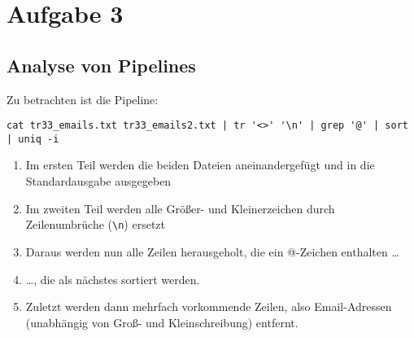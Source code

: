 \section{Aufgabe 3}
\subsection{Analyse von Pipelines}
Zu betrachten ist die Pipeline:
\lstset{language=Bash}
\begin{lstlisting}[style=Bash]
cat tr33_emails.txt tr33_emails2.txt | tr '<>' '\n' | grep '@' | sort | uniq -i
\end{lstlisting}
\begin{enumerate}
    \item Im ersten Teil werden die beiden Dateien aneinandergef\"ugt und in die
        Standardausgabe ausgegeben
    \item Im zweiten Teil werden alle Gr\"o\ss{}er- und Kleinerzeichen durch
        Zeilenumbr\"uche (\lstinline'\n') ersetzt
    \item Daraus werden nun alle Zeilen herausgeholt, die ein @-Zeichen
        enthalten \ldots
    \item \ldots, die als n\"achstes sortiert werden.
    \item Zuletzt werden dann mehrfach vorkommende Zeilen, also Email-Adressen
        (unabh\"angig von Gro\ss{}- und Kleinschreibung) entfernt.
\end{enumerate}

